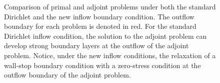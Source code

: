 \begin{figure}[h!]
\caption{Comparison of primal and adjoint problems under both the standard Dirichlet and the new inflow boundary condition. The outflow boundary for each problem is denoted in red. For the standard Dirichlet inflow condition, the solution to the adjoint problem can develop strong boundary layers at the outflow of the adjoint problem. Notice, under the new inflow conditions, the relaxation of a wall-stop boundary condition with a zero-stress condition at the outflow boundary of the adjoint problem.}
\end{figure}

